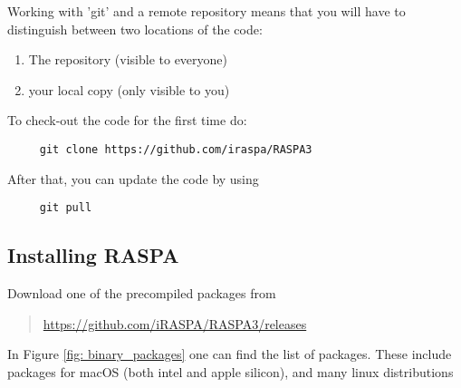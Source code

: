 Working with 'git' and a remote repository  means that you will have to distinguish between two locations of the code:
\begin{enumerate}
 \item{The repository (visible to everyone)}
 \item{your local copy (only visible to you)}
\end{enumerate}

To check-out the code for the first time do:
\begin{verbatim}
     git clone https://github.com/iraspa/RASPA3
\end{verbatim}
After that, you can update the code by using
\begin{verbatim}
     git pull
\end{verbatim}

\subsection{Installing RASPA}

Download one of the precompiled packages from
\begin{framed}
  \begin{quote}
    \url{https://github.com/iRASPA/RASPA3/releases}
  \end{quote}
\end{framed}
In Figure \ref{fig: binary_packages} one can find the list of packages. 
These include packages for macOS (both intel and apple silicon), and many linux distributions

